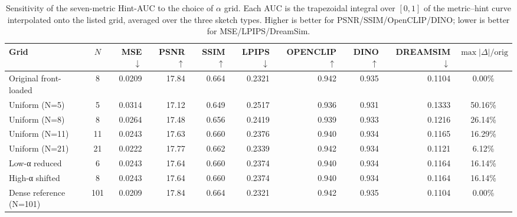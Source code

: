 \begin{table}[t]
  \centering
  \caption{Sensitivity of the seven-metric Hint-AUC to the choice of $\alpha$ grid. Each AUC is the trapezoidal integral over $[0,1]$ of the metric--hint curve interpolated onto the listed grid, averaged over the three sketch types. Higher is better for PSNR/SSIM/OpenCLIP/DINO; lower is better for MSE/LPIPS/DreamSim.}
  \label{tab:S-R2-1-B-2-7m}
  \small
  \begin{tabular}{l c rrrrrrr c}
    \toprule
    Grid & $N$ & MSE $\downarrow$ & PSNR $\uparrow$ & SSIM $\uparrow$ & LPIPS $\downarrow$ & OPENCLIP $\uparrow$ & DINO $\uparrow$ & DREAMSIM $\downarrow$ & $\max\!\big|\Delta\big|/\mathrm{orig}$ \\
    \midrule
    Original front-loaded      &   8 & 0.0209 & 17.84 & 0.664 & 0.2321 & 0.942 & 0.935 & 0.1104 &  0.00\% \\
    Uniform (N=5)              &   5 & 0.0314 & 17.12 & 0.649 & 0.2517 & 0.936 & 0.931 & 0.1333 & 50.16\% \\
    Uniform (N=8)              &   8 & 0.0264 & 17.48 & 0.656 & 0.2419 & 0.939 & 0.933 & 0.1216 & 26.14\% \\
    Uniform (N=11)             &  11 & 0.0243 & 17.63 & 0.660 & 0.2376 & 0.940 & 0.934 & 0.1165 & 16.29\% \\
    Uniform (N=21)             &  21 & 0.0222 & 17.77 & 0.662 & 0.2339 & 0.942 & 0.934 & 0.1121 &  6.12\% \\
    Low-α reduced              &   6 & 0.0243 & 17.64 & 0.660 & 0.2374 & 0.940 & 0.934 & 0.1164 & 16.14\% \\
    High-α shifted             &   8 & 0.0243 & 17.64 & 0.660 & 0.2374 & 0.940 & 0.934 & 0.1164 & 16.14\% \\
    Dense reference (N=101)    & 101 & 0.0209 & 17.84 & 0.664 & 0.2321 & 0.942 & 0.935 & 0.1104 &  0.00\% \\
    \bottomrule
  \end{tabular}
\end{table}
